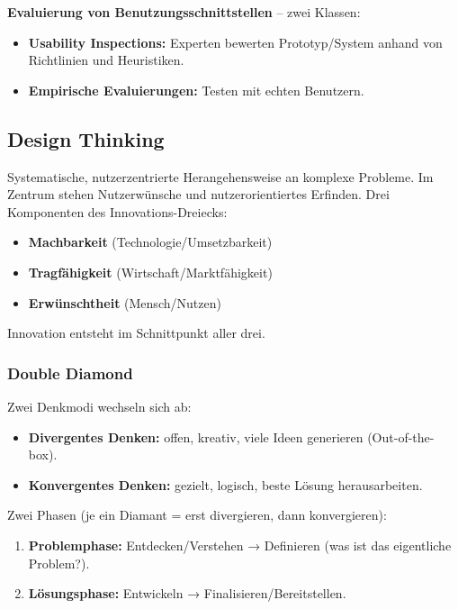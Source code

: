 \documentclass[12pt, a4paper]{article}
\begin{document}
\textbf{Evaluierung von Benutzungsschnittstellen} -- zwei Klassen:
\begin{itemize}
  \item \textbf{Usability Inspections:} Experten bewerten Prototyp/System anhand von Richtlinien und Heuristiken.
  \item \textbf{Empirische Evaluierungen:} Testen mit echten Benutzern.
\end{itemize}

\subsection{Design Thinking}

Systematische, nutzerzentrierte Herangehensweise an komplexe Probleme. Im Zentrum stehen Nutzerwünsche und nutzerorientiertes Erfinden. Drei Komponenten des Innovations-Dreiecks:
\begin{itemize}
  \item \textbf{Machbarkeit} (Technologie/Umsetzbarkeit)
  \item \textbf{Tragfähigkeit} (Wirtschaft/Marktfähigkeit)
  \item \textbf{Erwünschtheit} (Mensch/Nutzen)
\end{itemize}

Innovation entsteht im Schnittpunkt aller drei.

\subsubsection*{Double Diamond}

Zwei Denkmodi wechseln sich ab:
\begin{itemize}
  \item \textbf{Divergentes Denken:} offen, kreativ, viele Ideen generieren (Out-of-the-box).
  \item \textbf{Konvergentes Denken:} gezielt, logisch, beste Lösung herausarbeiten.
\end{itemize}

Zwei Phasen (je ein Diamant = erst divergieren, dann konvergieren):
\begin{enumerate}
  \item \textbf{Problemphase:} Entdecken/Verstehen → Definieren (was ist das eigentliche Problem?).
  \item \textbf{Lösungsphase:} Entwickeln → Finalisieren/Bereitstellen.
\end{enumerate}
\end{document}
